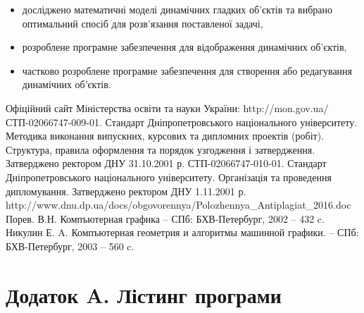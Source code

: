 \documentclass[14pt,a4paper]{extarticle}
\theoremstyle{definition}
\renewcommand{\[}{\begin{singlespace}\begin{equation*}}
\renewcommand{\]}{\end{equation*}\end{singlespace}}
\begin{document}
\begin{itemize}
\item досліджено математичні моделі динамічних гладких об'єктів та вибрано оптимальний спосіб для розв'язання поставленої задачі,
\item розроблене програмне забезпечення для відображення динамічних об'єктів,
\item частково розроблене програмне забезпечення для створення або редагування динамічних об'єктів.
\end{itemize}

\begin{thebibliography}{9}
\bibitem{} Офіційний сайт Міністерства освіти та науки України: http://mon.gov.ua/
\bibitem{} СТП-02066747-009-01. Стандарт Дніпропетровського національного університету. Методика виконання випускних, курсових та дипломних проектів (робіт). Структура, правила оформлення та порядок узгодження і затвердження. Затверджено ректором ДНУ 31.10.2001 р.
\bibitem{} СТП-02066747-010-01. Стандарт Дніпропетровського національного університету. Організація та проведення дипломування. Затверджено ректором ДНУ 1.11.2001 р.
\bibitem{} http://www.dnu.dp.ua/docs/obgovorennya/Polozhennya\_Antiplagiat\_2016.doc
 Порев. В.Н. Компъютерная графика -- СПб: БХВ-Петербург, 2002 -- 432 c.
 Никулин Е. A. Компъютерная геометрия и алгоритмы машинной графики. -- СПб: БХВ-Петербург, 2003 -- 560 c.
\end{thebibliography}

\section*{Додаток A. Лістинг програми}
\tiny
\end{document}
